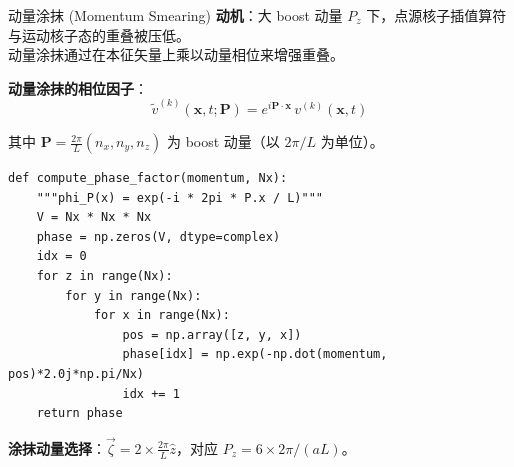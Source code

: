 \documentclass[10pt,aspectratio=169]{beamer}
\newcommand{\Pz}{P_z}
\begin{document}
\begin{frame}[fragile]{动量涂抹 (Momentum Smearing)}
\small
\textbf{动机}：大 boost 动量 $\Pz$ 下，点源核子插值算符与运动核子态的重叠被压低。\\
动量涂抹通过在本征矢量上乘以动量相位来增强重叠。

\textbf{动量涂抹的相位因子}：
\begin{equation}
  \boxed{
  \tilde{v}^{(k)}(\mathbf{x}, t; \mathbf{P}) = e^{i\mathbf{P}\cdot\mathbf{x}}\,
  v^{(k)}(\mathbf{x}, t)
  }
\end{equation}

其中 $\mathbf{P} = \frac{2\pi}{L}(n_x, n_y, n_z)$ 为 boost 动量（以 $2\pi/L$ 为单位）。

\begin{lstlisting}
def compute_phase_factor(momentum, Nx):
    """phi_P(x) = exp(-i * 2pi * P.x / L)"""
    V = Nx * Nx * Nx
    phase = np.zeros(V, dtype=complex)
    idx = 0
    for z in range(Nx):
        for y in range(Nx):
            for x in range(Nx):
                pos = np.array([z, y, x])
                phase[idx] = np.exp(-np.dot(momentum, pos)*2.0j*np.pi/Nx)
                idx += 1
    return phase
\end{lstlisting}

\textbf{涂抹动量选择}：$\vec{\zeta} = 2 \times \frac{2\pi}{L}\hat{z}$，对应 $P_z = 6 \times 2\pi/(aL)$。
\end{frame}
\end{document}
